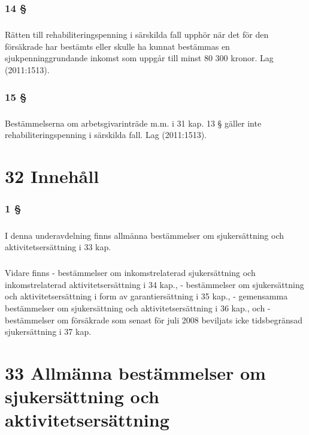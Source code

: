 \documentclass[a4paper,notitlepage,openany,10pt]{book}
\begin{document}
\subsection*{14 §}
\paragraph*{}
Rätten till rehabiliteringspenning i särskilda fall upphör när det för den försäkrade har bestämts eller skulle ha kunnat bestämmas en sjukpenninggrundande inkomst som uppgår till minst 80 300 kronor.
Lag (2011:1513).
\subsection*{15 §}
\paragraph*{}
Bestämmelserna om arbetsgivarinträde m.m. i 31 kap. 13 § gäller inte rehabiliteringspenning i särskilda fall.
Lag (2011:1513).
\chapter*{32 Innehåll}
\subsection*{1 §}
\paragraph*{}
I denna underavdelning finns allmänna bestämmelser om sjukersättning och aktivitetsersättning i 33 kap.
\paragraph*{}
Vidare finns
\newline - bestämmelser om inkomstrelaterad sjukersättning och inkomstrelaterad aktivitetsersättning i 34 kap.,
\newline - bestämmelser om sjukersättning och aktivitetsersättning i form av garantiersättning i 35 kap.,
\newline - gemensamma bestämmelser om sjukersättning och aktivitetsersättning i 36 kap., och
\newline - bestämmelser om försäkrade som senast för juli 2008 beviljats icke tidsbegränsad sjukersättning i 37 kap.
\chapter*{33 Allmänna bestämmelser om sjukersättning och aktivitetsersättning}
\end{document}
